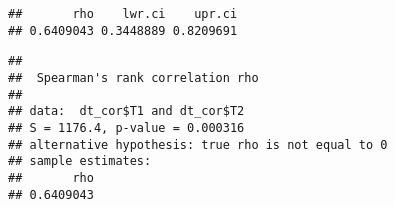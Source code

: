 \documentclass[
]{article}
\newenvironment{Shaded}{\begin{snugshade}}{\end{snugshade}}
\newcommand{\AttributeTok}[1]{\textcolor[rgb]{0.77,0.63,0.00}{#1}}
\newcommand{\FunctionTok}[1]{\textcolor[rgb]{0.00,0.00,0.00}{#1}}
\newcommand{\NormalTok}[1]{#1}
\newcommand{\SpecialCharTok}[1]{\textcolor[rgb]{0.00,0.00,0.00}{#1}}
\newcommand{\StringTok}[1]{\textcolor[rgb]{0.31,0.60,0.02}{#1}}
\begin{document}
\begin{verbatim}
##       rho    lwr.ci    upr.ci 
## 0.6409043 0.3448889 0.8209691
\end{verbatim}

\begin{Shaded}
\end{Shaded}

\begin{verbatim}
## 
##  Spearman's rank correlation rho
## 
## data:  dt_cor$T1 and dt_cor$T2
## S = 1176.4, p-value = 0.000316
## alternative hypothesis: true rho is not equal to 0
## sample estimates:
##       rho 
## 0.6409043
\end{verbatim}
\end{document}

